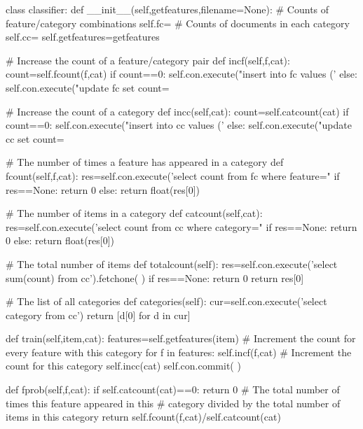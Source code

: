 \documentclass[12pt, letterpaper]{article}
\begin{document}
\begin{MyPython}[caption= Fisher Method, label=lst:fishermethod]
class classifier:
    def __init__(self,getfeatures,filename=None):
        # Counts of feature/category combinations
        self.fc={}
        # Counts of documents in each category
        self.cc={}
        self.getfeatures=getfeatures

    # Increase the count of a feature/category pair
    def incf(self,f,cat):
        count=self.fcount(f,cat)
        if count==0:
            self.con.execute("insert into fc values ('%
        else:
            self.con.execute("update fc set count=%

    # Increase the count of a category
    def incc(self,cat):
        count=self.catcount(cat)
        if count==0:
            self.con.execute("insert into cc values ('%
        else:
            self.con.execute("update cc set count=%

    # The number of times a feature has appeared in a category
    def fcount(self,f,cat):
        res=self.con.execute('select count from fc where feature="%
        if res==None:
            return 0
        else: return float(res[0])

    # The number of items in a category
    def catcount(self,cat):
        res=self.con.execute('select count from cc where category="%
        if res==None:
            return 0
        else:
            return float(res[0])

    # The total number of items
    def totalcount(self):
        res=self.con.execute('select sum(count) from cc').fetchone( )
        if res==None:
            return 0
        return res[0]

    # The list of all categories
    def categories(self):
        cur=self.con.execute('select category from cc')
        return [d[0] for d in cur]

    def train(self,item,cat):
        features=self.getfeatures(item)
        # Increment the count for every feature with this category
        for f in features:
            self.incf(f,cat)
        # Increment the count for this category
        self.incc(cat)
        self.con.commit( )

    def fprob(self,f,cat):
        if self.catcount(cat)==0:
            return 0
        # The total number of times this feature appeared in this
        # category divided by the total number of items in this category
        return self.fcount(f,cat)/self.catcount(cat)


\end{MyPython}
\end{document}
